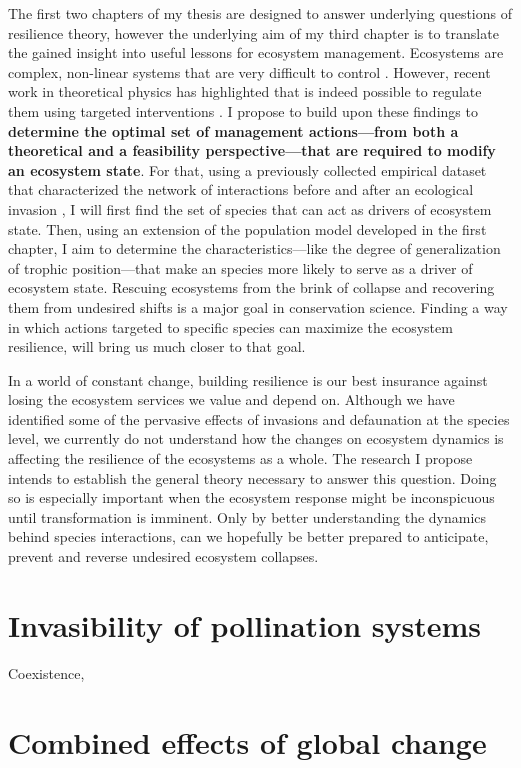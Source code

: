 \documentclass[a4paper]{report}
\begin{document}
The first two chapters of my thesis are designed to answer underlying questions of resilience theory, however the underlying aim of my third chapter is to translate the gained insight into useful lessons for ecosystem management.
Ecosystems are complex, non-linear systems that are very difficult to control .
However, recent work in theoretical physics has highlighted that is indeed possible to regulate them using targeted interventions \citep{Cornelius2013}.
I propose to build upon these findings to \textbf{determine the optimal set of management actions---from both a theoretical and a feasibility perspective---that are required to modify an ecosystem state}.
For that, using a previously collected empirical dataset that characterized the network of interactions before and after an ecological invasion \citep{Bartomeus2008}, I will first find the set of species that can act as drivers of ecosystem state.
Then, using an extension of the population model developed in the first chapter, I aim to determine the characteristics---like the degree of generalization of trophic position---that make an species more likely to serve as a driver of ecosystem state.
Rescuing ecosystems from the brink of collapse and recovering them from undesired shifts is a major goal in conservation science.
Finding a way in which actions targeted to specific species can maximize the ecosystem resilience, will bring us much closer to that goal.

In a world of constant change, building resilience is our best insurance against losing the ecosystem services we value and depend on.
Although we have identified some of the pervasive effects of invasions and defaunation at the species level, we currently do not understand how the changes on ecosystem dynamics is affecting the resilience of the ecosystems as a whole.
The research I propose intends to establish the general theory necessary to answer this question.
Doing so is especially important when the ecosystem response might be inconspicuous until transformation is imminent.
Only by better understanding the dynamics behind species interactions, can we hopefully be better prepared to anticipate, prevent and reverse undesired ecosystem collapses.

\chapter*{Invasibility of pollination systems}

Coexistence,
\chapter*{Combined effects of global change}
\end{document}
